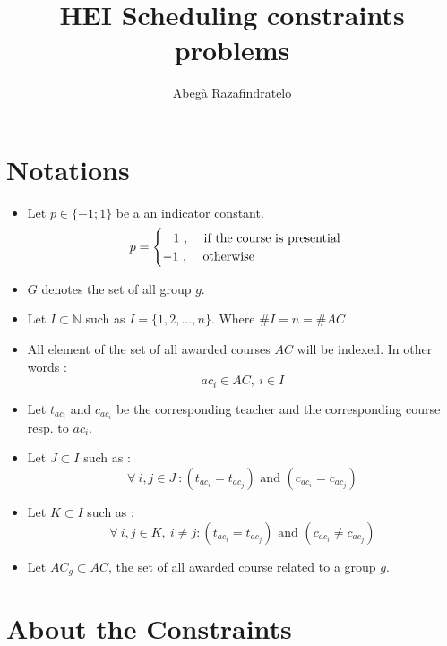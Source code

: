 \documentclass[12pt,a4paper]{article}
\author{Abegà Razafindratelo}
\title{HEI Scheduling constraints problems}
\begin{document}
\maketitle
\section*{Notations}
\begin{itemize}
	\item Let $p \in \{-1;1\} $ be a an indicator constant.
	$$
	p = 
	\begin{cases}
		\hspace{0.3cm} 1 \text{ , \quad if the course is presential} \\
		-1 \text{ , \quad otherwise}
	\end{cases} 
	$$
	\item $G$ denotes the set of all group $g$.
	
	\item Let $I \subset \mathbb{N}$ such as $I = \lbrace 1, 2, ..., n \rbrace$. Where $\#I = n = \#AC$
	
	\item All element of the set of all awarded courses $AC$ will be indexed. In other words :
	$$
	 ac_{i} \in AC,\ i \in I
	$$
	
	\item Let $t_{ac_{i}}$ and $c_{ac_{i}}$ be the corresponding teacher and the corresponding course resp. to  $ac_{i}$.
	
	\item Let $J \subset I$ such as :
	$$
	\forall \ i, j \in J \ : \left(t_{ac_{i}} = t_{ac_{j}} \right) \text{ and } 
	\left(c_{ac_{i}} = c_{ac_{j}} \right)
	$$ 
	
	\item Let $K \subset I$ such as :
	$$
	\forall \ i, j \in K, \ i \neq j : \left(t_{ac_{i}} = t_{ac_{j}} \right) \text{ and } 
	\left(c_{ac_{i}} \neq c_{ac_{j}} \right)
	$$ 
	
	\item Let $AC_{g} \subset AC$, the set of all awarded course related to a group $g$.
	

\end{itemize}

\section*{About the Constraints}
\end{document}
